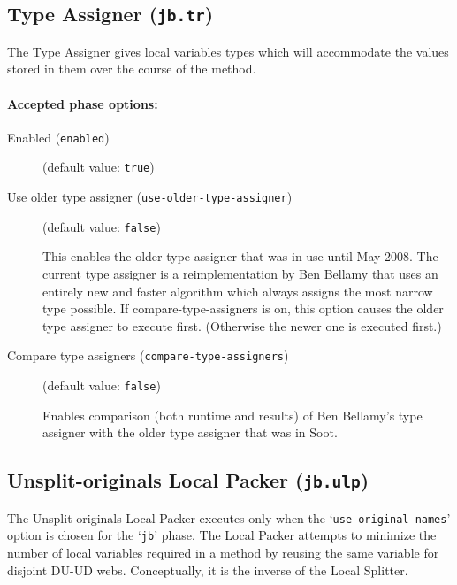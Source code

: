 \documentclass{article}
\begin{document}
\subsection{Type Assigner ({\tt jb.tr})}

The Type Assigner gives local variables types which will
accommodate the values stored in them over the course of the
method.


\paragraph{Accepted phase options:} 

\begin{description}

\item[Enabled ({\tt enabled})]
(default value: {\tt true})






\item[Use older type assigner ({\tt use-older-type-assigner})]
(default value: {\tt false})




This enables the older type assigner that was in use until May 2008.
The current type assigner is a reimplementation by Ben Bellamy
that uses an entirely new and faster algorithm which always assigns
the most narrow type possible. If compare-type-assigners is on,
this option causes the older type assigner to execute first.
(Otherwise the newer one is executed first.)



\item[Compare type assigners ({\tt compare-type-assigners})]
(default value: {\tt false})




Enables comparison (both runtime and results) of Ben Bellamy's type assigner with the
older type assigner that was in Soot.



\end{description}

\subsection{Unsplit-originals Local Packer ({\tt jb.ulp})}

The Unsplit-originals Local Packer executes only when the
`{\tt use-original-names}' option is chosen for the
`{\tt jb}' phase.  The Local Packer attempts to minimize
the number of local variables required in a method by reusing the
same variable for disjoint DU-UD webs. Conceptually, it is the
inverse of the Local Splitter.
\end{document}
